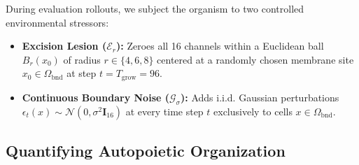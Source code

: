 \documentclass[10pt,twocolumn]{article}
\begin{document}
During evaluation rollouts, we subject the organism to two controlled environmental stressors:
\begin{itemize}\setlength{\itemsep}{1pt}\setlength{\parskip}{0pt}
    \item \textbf{Excision Lesion ($\mathcal{E}_r$):} Zeroes all 16 channels within a Euclidean ball $B_r(x_0)$ of radius $r \in \{4, 6, 8\}$ centered at a randomly chosen membrane site $x_0 \in \Omega_{\text{bnd}}$ at step $t = T_{\text{grow}} = 96$.
    \item \textbf{Continuous Boundary Noise ($\mathcal{G}_\sigma$):} Adds i.i.d. Gaussian perturbations $\epsilon_t(x) \sim \mathcal{N}(0, \sigma^2 \mathbf{I}_{16})$ at every time step $t$ exclusively to cells $x \in \Omega_{\text{bnd}}$.
\end{itemize}

\subsection{Quantifying Autopoietic Organization}
\end{document}

